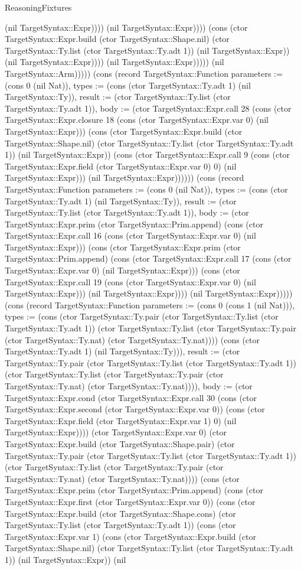 \begin{lexlean}{ReasoningFixtures}
\begin{semanticmodule}
{(nil TargetSyntax::Expr)))) (nil TargetSyntax::Expr)))) (cons (ctor TargetSyntax::Expr.build (ctor TargetSyntax::Shape.nil) (ctor TargetSyntax::Ty.list (ctor TargetSyntax::Ty.adt 1)) (nil TargetSyntax::Expr)) (nil TargetSyntax::Expr)))) (nil TargetSyntax::Expr))))) (nil TargetSyntax::Arm))))}) (cons (record TargetSyntax::Function {parameters := (cons 0 (nil Nat)), types := (cons (ctor TargetSyntax::Ty.adt 1) (nil TargetSyntax::Ty)), result := (ctor TargetSyntax::Ty.list (ctor TargetSyntax::Ty.adt 1)), body := (ctor TargetSyntax::Expr.call 28 (cons (ctor TargetSyntax::Expr.closure 18 (cons (ctor TargetSyntax::Expr.var 0) (nil TargetSyntax::Expr))) (cons (ctor TargetSyntax::Expr.build (ctor TargetSyntax::Shape.nil) (ctor TargetSyntax::Ty.list (ctor TargetSyntax::Ty.adt 1)) (nil TargetSyntax::Expr)) (cons (ctor TargetSyntax::Expr.call 9 (cons (ctor TargetSyntax::Expr.field (ctor TargetSyntax::Expr.var 0) 0) (nil TargetSyntax::Expr))) (nil TargetSyntax::Expr)))))}) (cons (record TargetSyntax::Function {parameters := (cons 0 (nil Nat)), types := (cons (ctor TargetSyntax::Ty.adt 1) (nil TargetSyntax::Ty)), result := (ctor TargetSyntax::Ty.list (ctor TargetSyntax::Ty.adt 1)), body := (ctor TargetSyntax::Expr.prim (ctor TargetSyntax::Prim.append) (cons (ctor TargetSyntax::Expr.call 16 (cons (ctor TargetSyntax::Expr.var 0) (nil TargetSyntax::Expr))) (cons (ctor TargetSyntax::Expr.prim (ctor TargetSyntax::Prim.append) (cons (ctor TargetSyntax::Expr.call 17 (cons (ctor TargetSyntax::Expr.var 0) (nil TargetSyntax::Expr))) (cons (ctor TargetSyntax::Expr.call 19 (cons (ctor TargetSyntax::Expr.var 0) (nil TargetSyntax::Expr))) (nil TargetSyntax::Expr)))) (nil TargetSyntax::Expr))))}) (cons (record TargetSyntax::Function {parameters := (cons 0 (cons 1 (nil Nat))), types := (cons (ctor TargetSyntax::Ty.pair (ctor TargetSyntax::Ty.list (ctor TargetSyntax::Ty.adt 1)) (ctor TargetSyntax::Ty.list (ctor TargetSyntax::Ty.pair (ctor TargetSyntax::Ty.nat) (ctor TargetSyntax::Ty.nat)))) (cons (ctor TargetSyntax::Ty.adt 1) (nil TargetSyntax::Ty))), result := (ctor TargetSyntax::Ty.pair (ctor TargetSyntax::Ty.list (ctor TargetSyntax::Ty.adt 1)) (ctor TargetSyntax::Ty.list (ctor TargetSyntax::Ty.pair (ctor TargetSyntax::Ty.nat) (ctor TargetSyntax::Ty.nat)))), body := (ctor TargetSyntax::Expr.cond (ctor TargetSyntax::Expr.call 30 (cons (ctor TargetSyntax::Expr.second (ctor TargetSyntax::Expr.var 0)) (cons (ctor TargetSyntax::Expr.field (ctor TargetSyntax::Expr.var 1) 0) (nil TargetSyntax::Expr)))) (ctor TargetSyntax::Expr.var 0) (ctor TargetSyntax::Expr.build (ctor TargetSyntax::Shape.pair) (ctor TargetSyntax::Ty.pair (ctor TargetSyntax::Ty.list (ctor TargetSyntax::Ty.adt 1)) (ctor TargetSyntax::Ty.list (ctor TargetSyntax::Ty.pair (ctor TargetSyntax::Ty.nat) (ctor TargetSyntax::Ty.nat)))) (cons (ctor TargetSyntax::Expr.prim (ctor TargetSyntax::Prim.append) (cons (ctor TargetSyntax::Expr.first (ctor TargetSyntax::Expr.var 0)) (cons (ctor TargetSyntax::Expr.build (ctor TargetSyntax::Shape.cons) (ctor TargetSyntax::Ty.list (ctor TargetSyntax::Ty.adt 1)) (cons (ctor TargetSyntax::Expr.var 1) (cons (ctor TargetSyntax::Expr.build (ctor TargetSyntax::Shape.nil) (ctor TargetSyntax::Ty.list (ctor TargetSyntax::Ty.adt 1)) (nil TargetSyntax::Expr)) (nil }
\end{semanticmodule}
\end{lexlean}
